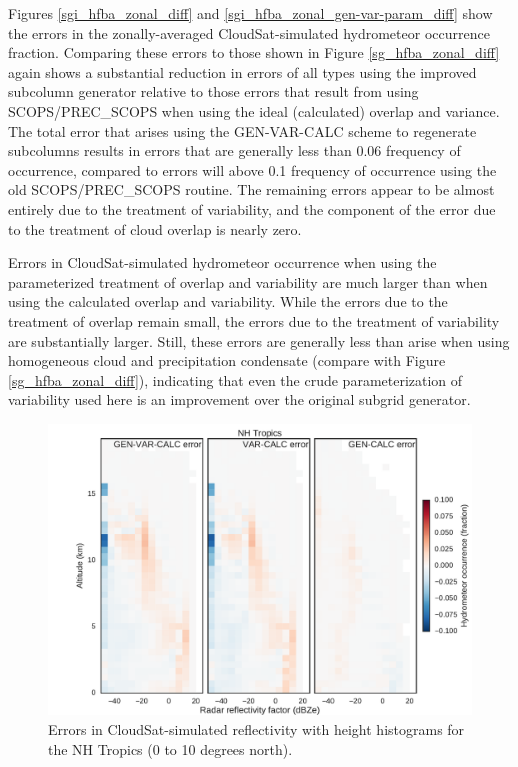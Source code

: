 Figures \ref{sgi_hfba_zonal_diff} and \ref{sgi_hfba_zonal_gen-var-param_diff} show the errors in the zonally-averaged CloudSat-simulated hydrometeor occurrence fraction. Comparing these errors to those shown in Figure \ref{sg_hfba_zonal_diff} again shows a substantial reduction in errors of all types using the improved subcolumn generator relative to those errors that result from using SCOPS/PREC\_SCOPS when using the ideal (calculated) overlap and variance. The total error that arises using the GEN-VAR-CALC scheme to regenerate subcolumns results in errors that are generally less than 0.06 frequency of occurrence, compared to errors will above 0.1 frequency of occurrence using the old SCOPS/PREC\_SCOPS routine. The remaining errors appear to be almost entirely due to the treatment of variability, and the component of the error due to the treatment of cloud overlap is nearly zero.

Errors in CloudSat-simulated hydrometeor occurrence when using the parameterized treatment of overlap and variability are much larger than when using the calculated overlap and variability. While the errors due to the treatment of overlap remain small, the errors due to the treatment of variability are substantially larger. Still, these errors are generally less than arise when using homogeneous cloud and precipitation condensate (compare with Figure \ref{sg_hfba_zonal_diff}), indicating that even the crude parameterization of variability used here is an improvement over the original subgrid generator.

\begin{figure}
\centering
\includegraphics[width=\columnwidth]{graphics/subgrid2_cfadDbze94_NHTropics_gen-var-calc_diff.pdf}
\caption{Errors in CloudSat-simulated reflectivity with height histograms for the NH Tropics (0 to 10 degrees north).}
\label{sgi_cfadDbze94_nhtropics_diff}
\end{figure}

